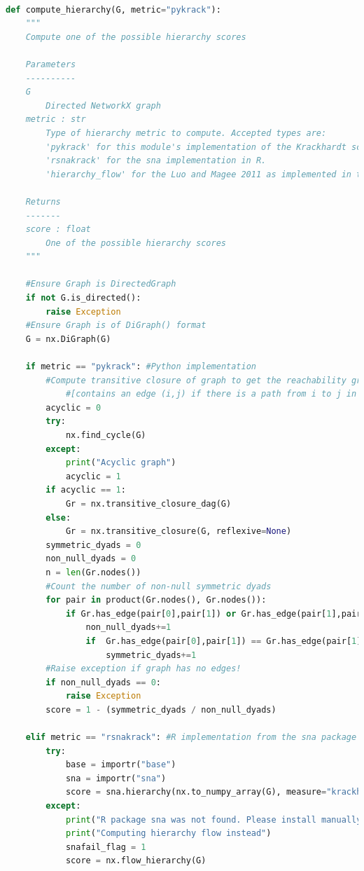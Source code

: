 \label{lst:pykrack}
\begin{lstlisting}[language=Python, caption=\textbf{Main pyKrack function}. The \emph{compute\_hierarchy} function takes in a directed graph and computes its hierarchy flow score or the Krackhardt hierarchy score using an existing R implementation or a novel one in Python.]

def compute_hierarchy(G, metric="pykrack"):
    """
    Compute one of the possible hierarchy scores
    
    Parameters
    ----------
    G
        Directed NetworkX graph
    metric : str
        Type of hierarchy metric to compute. Accepted types are:
        'pykrack' for this module's implementation of the Krackhardt score.
        'rsnakrack' for the sna implementation in R.
        'hierarchy_flow' for the Luo and Magee 2011 as implemented in the NetworkX package.

    Returns
    -------
    score : float
        One of the possible hierarchy scores
    """

    #Ensure Graph is DirectedGraph
    if not G.is_directed():
        raise Exception
    #Ensure Graph is of DiGraph() format
    G = nx.DiGraph(G)

    if metric == "pykrack": #Python implementation
        #Compute transitive closure of graph to get the reachability graph
            #[contains an edge (i,j) if there is a path from i to j in the original graph]
        acyclic = 0
        try:
            nx.find_cycle(G)
        except:
            print("Acyclic graph")
            acyclic = 1
        if acyclic == 1:
            Gr = nx.transitive_closure_dag(G)
        else:
            Gr = nx.transitive_closure(G, reflexive=None)
        symmetric_dyads = 0
        non_null_dyads = 0
        n = len(Gr.nodes())
        #Count the number of non-null symmetric dyads
        for pair in product(Gr.nodes(), Gr.nodes()):
            if Gr.has_edge(pair[0],pair[1]) or Gr.has_edge(pair[1],pair[0]): #Non-null dyad
                non_null_dyads+=1
                if  Gr.has_edge(pair[0],pair[1]) == Gr.has_edge(pair[1],pair[0]): #Symmetric!
                    symmetric_dyads+=1
        #Raise exception if graph has no edges!
        if non_null_dyads == 0:
            raise Exception
        score = 1 - (symmetric_dyads / non_null_dyads)
    
    elif metric == "rsnakrack": #R implementation from the sna package
        try:
            base = importr("base")
            sna = importr("sna")
            score = sna.hierarchy(nx.to_numpy_array(G), measure="krackhardt")[0]
        except:
            print("R package sna was not found. Please install manually!")
            print("Computing hierarchy flow instead")
            snafail_flag = 1
            score = nx.flow_hierarchy(G)
    

\end{lstlisting}
